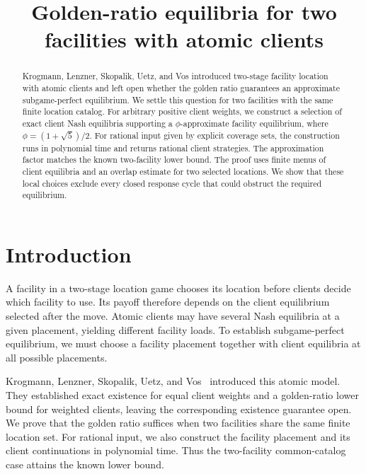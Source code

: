 \documentclass[11pt]{amsart}
\title{Golden-ratio equilibria for two facilities with atomic clients}
\date{}
\numberwithin{equation}{section}
\theoremstyle{definition}
\begin{document}
\begin{abstract}
Krogmann, Lenzner, Skopalik, Uetz, and Vos introduced two-stage facility location with atomic clients and left open whether the golden ratio guarantees an approximate subgame-perfect equilibrium. We settle this question for two facilities with the same finite location catalog. For arbitrary positive client weights, we construct a selection of exact client Nash equilibria supporting a $\phi$-approximate facility equilibrium, where $\phi=(1+\sqrt5)/2$. For rational input given by explicit coverage sets, the construction runs in polynomial time and returns rational client strategies. The approximation factor matches the known two-facility lower bound. The proof uses finite menus of client equilibria and an overlap estimate for two selected locations. We show that these local choices exclude every closed response cycle that could obstruct the required equilibrium.
\end{abstract}
\maketitle

\section{Introduction}\label{sec:introduction}
A facility in a two-stage location game chooses its location before clients decide which facility to use. Its payoff therefore depends on the client equilibrium selected after the move. Atomic clients may have several Nash equilibria at a given placement, yielding different facility loads. To establish subgame-perfect equilibrium, we must choose a facility placement together with client equilibria at all possible placements.

Krogmann, Lenzner, Skopalik, Uetz, and Vos~\cite{krogmann2024} introduced this atomic model. They established exact existence for equal client weights and a golden-ratio lower bound for weighted clients, leaving the corresponding existence guarantee open. We prove that the golden ratio suffices when two facilities share the same finite location set. For rational input, we also construct the facility placement and its client continuations in polynomial time. Thus the two-facility common-catalog case attains the known lower bound.
\end{document}
